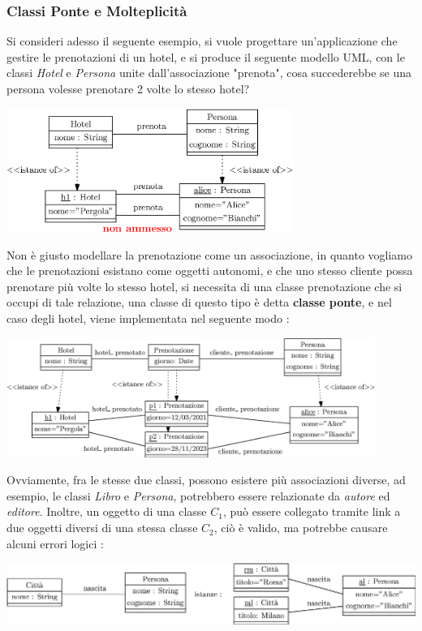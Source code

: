 \documentclass[12pt, letterpaper]{article}
\begin{document}
\subsubsection{Classi Ponte e Molteplicità}
Si consideri adesso il seguente esempio, si vuole progettare un'applicazione che gestire le prenotazioni di un 
hotel, e si produce il seguente modello UML, con le classi \textit{Hotel} e \textit{Persona} unite dall'associazione 
"prenota", cosa succederebbe se una persona volesse prenotare 2 volte lo stesso hotel? \begin{center}
    \includegraphics[width=0.7\textwidth ]{images/hotelSbagliato.eps}
\end{center}
Non è giusto modellare la prenotazione come un associazione, in quanto vogliamo che le prenotazioni esistano come 
oggetti autonomi, e che uno stesso cliente possa prenotare più volte lo stesso hotel, si necessita di una classe 
prenotazione che si occupi di tale relazione, una classe di questo tipo è detta \textbf{classe ponte}, e nel 
caso degli hotel, viene 
implementata nel seguente modo : \begin{center}
    \includegraphics[width=0.9\textwidth ]{images/hotelGiusto.eps}
\end{center}
Ovviamente, fra le stesse due classi, possono esistere più associazioni diverse, ad esempio, le classi 
\textit{Libro} e \textit{Persona}, potrebbero essere relazionate da \textit{autore} ed \textit{editore}. Inoltre, 
un oggetto di una classe \(C_1\), può essere collegato tramite link a due oggetti diversi di una stessa classe 
\(C_2\), ciò è valido, ma potrebbe causare alcuni errori logici : \begin{center}
    \includegraphics[width=1\textwidth ]{images/multError.eps}
\end{center}
\end{document}
